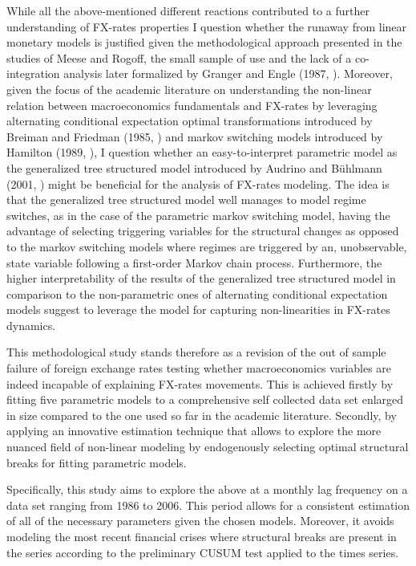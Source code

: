 While all the above-mentioned different reactions contributed to a
further understanding of FX-rates properties I question whether the
runaway from linear monetary models is justified given the
methodological approach presented in the studies of Meese and Rogoff,
the small sample of use and the lack of a co-integration analysis
later formalized by Granger and Engle (1987,
\cite{EngleGranger}). Moreover, given the focus of the academic
literature on understanding the non-linear relation between
macroeconomics fundamentals and FX-rates by leveraging alternating
conditional expectation optimal transformations introduced by Breiman
and Friedman (1985, \cite{BreimanFriedman}) and markov switching
models introduced by Hamilton (1989, \cite{Hamilton}), I question
whether an easy-to-interpret parametric model as the generalized tree
structured model introduced by Audrino and B{\"u}hlmann (2001,
\cite{AudrinoBuhlmann}) might be beneficial for the analysis of
FX-rates modeling. The idea is that the generalized tree structured
model well manages to model regime switches, as in the case of the
parametric markov switching model, having the advantage of selecting
triggering variables for the structural changes as opposed to the
markov switching models where regimes are triggered by an,
unobservable, state variable following a first-order Markov
chain process. Furthermore, the higher interpretability of the results of the
generalized tree structured model in comparison to the non-parametric
ones of alternating conditional expectation models suggest to leverage
the model for capturing non-linearities in FX-rates dynamics.

% 
%
This methodological study stands therefore as a revision of the out of
sample failure of foreign exchange rates testing whether
macroeconomics variables are indeed incapable of explaining FX-rates
movements. This is achieved firstly by fitting five parametric models
to a comprehensive self collected data set enlarged in size compared
to the one used so far in the academic literature. Secondly, by
applying an innovative estimation technique that allows to explore the
more nuanced field of non-linear modeling by endogenously selecting
optimal structural breaks for fitting parametric models.

Specifically, this study aims to explore the above at a monthly lag
frequency on a data set ranging from 1986 to 2006. This period allows
for a consistent estimation of all of the necessary parameters given
the chosen models. Moreover, it avoids modeling the most recent
financial crises where structural breaks are present in the series
according to the preliminary CUSUM test applied to the times series.

